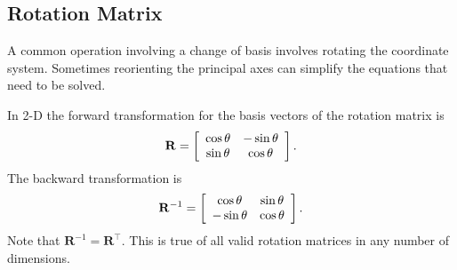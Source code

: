 \subsection{Rotation Matrix}

A common operation involving a change of basis involves rotating the coordinate system. Sometimes reorienting the principal axes can simplify the equations that need to be solved.

In 2-D the forward transformation for the basis vectors of the rotation matrix is
\begin{align}
  \mathbf{R} = \left[ \begin{array}{c c} \cos \theta & -\sin \theta \\ \sin \theta & \cos \theta \\ \end{array} \right] .
\end{align}
The backward transformation is
\begin{align}
  \mathbf{R}^{-1} = \left[ \begin{array}{c c} \cos \theta & \sin \theta \\ -\sin \theta & \cos \theta \\ \end{array} \right] .
\end{align}
Note that $\mathbf{R}^{-1} = \mathbf{R}^\top$. This is true of all valid rotation matrices in any number of dimensions.

